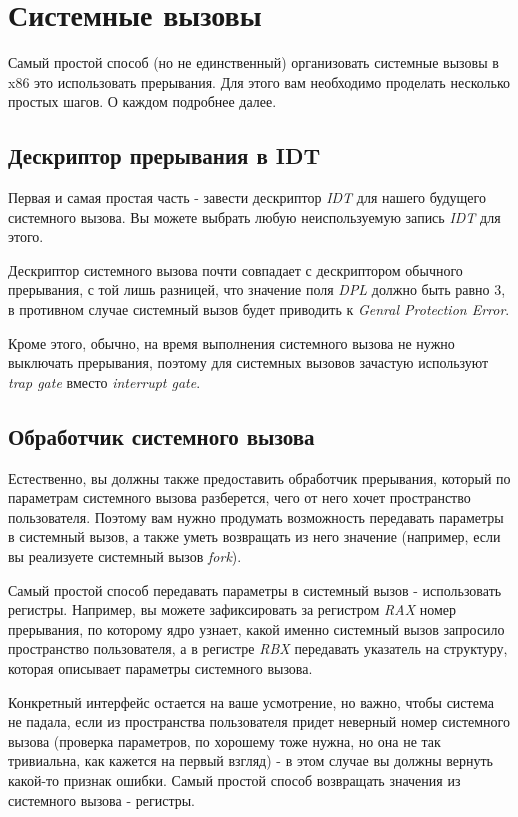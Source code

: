 \section{Системные вызовы}

Самый простой способ (но не единственный) организовать системные вызовы в x86
это использовать прерывания. Для этого вам необходимо проделать несколько простых
шагов. О каждом подробнее далее.

\subsection{Дескриптор прерывания в IDT}

Первая и самая простая часть - завести дескриптор \emph{IDT} для нашего будущего
системного вызова. Вы можете выбрать любую неиспользуемую запись \emph{IDT} для
этого.

Дескриптор системного вызова почти совпадает с дескриптором обычного прерывания,
с той лишь разницей, что значение поля \emph{DPL} должно быть равно 3, в противном
случае системный вызов будет приводить к \emph{Genral Protection Error}.

Кроме этого, обычно, на время выполнения системного вызова не нужно выключать
прерывания, поэтому для системных вызовов зачастую используют \emph{trap gate}
вместо \emph{interrupt gate}.

\subsection{Обработчик системного вызова}

Естественно, вы должны также предоставить обработчик прерывания, который по
параметрам системного вызова разберется, чего от него хочет пространство
пользователя. Поэтому вам нужно продумать возможность передавать параметры в
системный вызов, а также уметь возвращать из него значение (например, если
вы реализуете системный вызов \emph{fork}).

Самый простой способ передавать параметры в системный вызов - использовать
регистры. Например, вы можете зафиксировать за регистром \emph{RAX} номер
прерывания, по которому ядро узнает, какой именно системный вызов запросило
пространство пользователя, а в регистре \emph{RBX} передавать указатель на
структуру, которая описывает параметры системного вызова.

Конкретный интерфейс остается на ваше усмотрение, но важно, чтобы система не
падала, если из пространства пользователя придет неверный номер системного
вызова (проверка параметров, по хорошему тоже нужна, но она не так тривиальна,
как кажется на первый взгляд) - в этом случае вы должны вернуть какой-то признак
ошибки. Самый простой способ возвращать значения из системного вызова - регистры.

